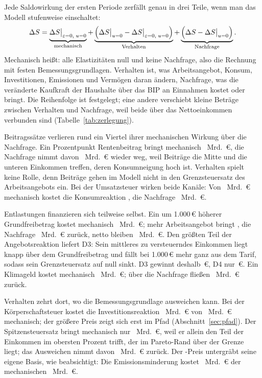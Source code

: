 Jede Saldowirkung der ersten Periode zerfällt genau in drei Teile, wenn man das
Modell stufenweise einschaltet:
\begin{equation}
\Delta S=\underbrace{\Delta S\big|_{\varepsilon=0,\;u=0}}_{\text{mechanisch}}
+\underbrace{\Bigl(\Delta S\big|_{u=0}-\Delta S\big|_{\varepsilon=0,\;u=0}\Bigr)}_{\text{Verhalten}}
+\underbrace{\Bigl(\Delta S-\Delta S\big|_{u=0}\Bigr)}_{\text{Nachfrage}} .
\end{equation}
Mechanisch heißt: alle Elastizitäten null und keine Nachfrage, also die Rechnung
mit festen Bemessungsgrundlagen. Verhalten ist, was Arbeitsangebot, Konsum,
Investitionen, Emissionen und Vermögen daran ändern, Nachfrage, was die veränderte
Kaufkraft der Haushalte über das BIP an Einnahmen kostet oder bringt. Die
Reihenfolge ist festgelegt; eine andere verschiebt kleine Beträge zwischen
Verhalten und Nachfrage, weil beide über das Nettoeinkommen verbunden sind
(Tabelle~\ref{tab:zerlegung}).

Beitragssätze verlieren rund ein Viertel ihrer mechanischen Wirkung über die
Nachfrage. Ein Prozentpunkt Rentenbeitrag bringt mechanisch ~Mrd.~\euro,
die Nachfrage nimmt davon ~Mrd.~\euro{} wieder weg, weil
Beiträge die Mitte und die unteren Einkommen treffen, deren Konsumneigung hoch
ist. Verhalten spielt keine Rolle, denn Beiträge gehen im Modell nicht in den
Grenzsteuersatz des Arbeitsangebots ein. Bei der Umsatzsteuer wirken beide
Kanäle: Von ~Mrd.~\euro{} mechanisch kostet die
Konsumreaktion , die Nachfrage
~Mrd.~\euro.

Entlastungen finanzieren sich teilweise selbst. Ein um 1.000\,\euro{} höherer
Grundfreibetrag kostet mechanisch ~Mrd.~\euro;
mehr Arbeitsangebot bringt , die Nachfrage
~Mrd.~\euro{} zurück, netto bleiben
~Mrd.~\euro. Den größten Teil der Angebotsreaktion
liefert D3: Sein mittleres zu versteuerndes Einkommen liegt knapp über dem
Grundfreibetrag und fällt bei 1.000\,\euro{} mehr ganz aus dem Tarif, sodass sein
Grenzsteuersatz auf null sinkt. D3 gewinnt deshalb
\,\euro, D4 nur \,\euro. Ein
Klimageld kostet mechanisch ~Mrd.~\euro; über die
Nachfrage fließen ~Mrd.~\euro{} zurück.

Verhalten zehrt dort, wo die Bemessungsgrundlage ausweichen kann. Bei der
Körperschaftsteuer kostet die Investitionsreaktion
~Mrd.~\euro{} von ~Mrd.~\euro{}
mechanisch; der größere Preis zeigt sich erst im Pfad (Abschnitt~\ref{sec:pfad}).
Der Spitzensteuersatz bringt mechanisch nur ~Mrd.~\euro,
weil er allein den Teil der Einkommen im obersten Prozent trifft, der im
Pareto-Rand über der Grenze liegt; das Ausweichen nimmt davon
~Mrd.~\euro{} zurück. Der \COz-Preis untergräbt
seine eigene Basis, wie beabsichtigt: Die Emissionsminderung kostet
~Mrd.~\euro{} der mechanischen
~Mrd.~\euro.

